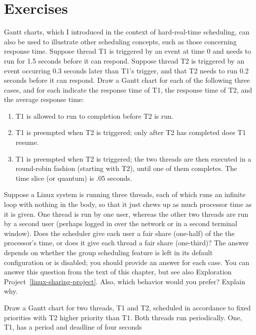\section*{Exercises}
\begin{chapterEnumerate}
\item
Gantt charts, which I introduced in the context of hard-real-time
scheduling, can also be used to illustrate other scheduling concepts,
such as those concerning response time.  Suppose thread T1 is
triggered by an event at time 0 and needs to run for 1.5 seconds
before it can respond.  Suppose thread T2 is triggered by an event
occurring 0.3 seconds later than T1's trigger, and that T2 needs to run
0.2 seconds before it can respond.  Draw a Gantt chart for each of the
following three cases, and for each indicate the response time of T1,
the response time of T2, and the average response time:
\begin{enumerate}
\item
T1 is allowed to run to completion before T2 is run.
\item
T1 is preempted when T2 is triggered; only after T2 has completed does
T1 resume.
\item
T1 is preempted when T2 is triggered; the two threads are then
executed in a round-robin fashion (starting with T2), until one
of them completes.  The time slice (or quantum) is .05 seconds.
\end{enumerate}
\item\label{linux-sharing-exercise}
Suppose a Linux system is running three threads, each of which runs an
infinite loop with nothing in the body, so that it just chews up as
much processor time as it is given.  One thread is run by one user,
whereas the other two threads are run by a second user (perhaps logged
in over the network or in a second terminal window).  Does the
scheduler give each user a fair share (one-half) of the the
processor's time, or does it give each thread a fair share (one-third)?
The answer depends on whether the group scheduling feature is
left in its default configuration or is disabled; you should
provide an answer for each case.
You can answer this question from the text of this chapter, but see
also Exploration Project~\ref{linux-sharing-project}.
Also, which behavior would you prefer?  Explain why.
\item\label{Gantt-backward-RMS-exercise}
Draw a Gantt chart for two threads, T1 and T2, scheduled in accordance
to fixed priorities with T2 higher priority than T1.  Both threads run
periodically.  One, T1, has a period and deadline of four seconds

\end{chapterEnumerate}
